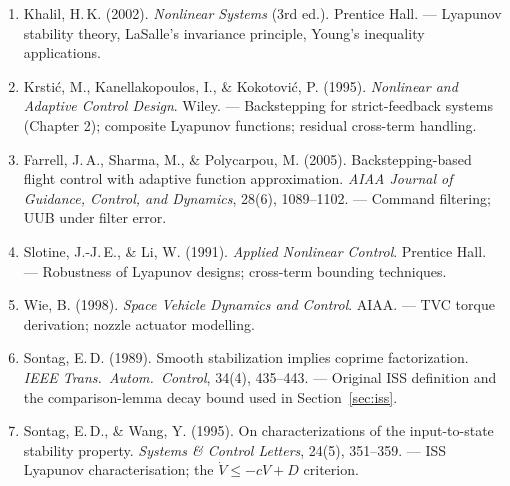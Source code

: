 \documentclass[11pt,a4paper]{article}
\theoremstyle{plain}
\theoremstyle{remark}
\begin{document}
\begin{enumerate}
  \item Khalil, H.\,K. (2002). \textit{Nonlinear Systems} (3rd ed.). Prentice Hall. --- Lyapunov stability theory, LaSalle's invariance principle, Young's inequality applications.
  \item Krsti\'{c}, M., Kanellakopoulos, I., \& Kokotovi\'{c}, P. (1995). \textit{Nonlinear and Adaptive Control Design}. Wiley. --- Backstepping for strict-feedback systems (Chapter 2); composite Lyapunov functions; residual cross-term handling.
  \item Farrell, J.\,A., Sharma, M., \& Polycarpou, M. (2005). Backstepping-based flight control with adaptive function approximation. \textit{AIAA Journal of Guidance, Control, and Dynamics}, 28(6), 1089--1102. --- Command filtering; UUB under filter error.
  \item Slotine, J.-J.\,E., \& Li, W. (1991). \textit{Applied Nonlinear Control}. Prentice Hall. --- Robustness of Lyapunov designs; cross-term bounding techniques.
  \item Wie, B. (1998). \textit{Space Vehicle Dynamics and Control}. AIAA. --- TVC torque derivation; nozzle actuator modelling.
  \item Sontag, E.\,D. (1989). Smooth stabilization implies coprime factorization. \textit{IEEE Trans.\ Autom.\ Control}, 34(4), 435--443. --- Original ISS definition and the comparison-lemma decay bound used in Section~\ref{sec:iss}.
  \item Sontag, E.\,D., \& Wang, Y. (1995). On characterizations of the input-to-state stability property. \textit{Systems \& Control Letters}, 24(5), 351--359. --- ISS Lyapunov characterisation; the $\dot V \leq -cV + D$ criterion.
\end{enumerate}
\end{document}
